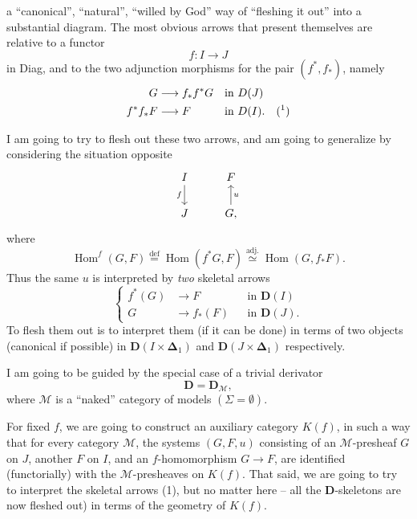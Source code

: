 \documentclass[11pt]{article}
\newcommand{\printedpage}[1]{\marginpar{\footnotesize p.~#1}}
\newcommand{\msp}[1]{\marginpar{\footnotesize [#1]}}
\newcommand{\Hom}{\operatorname{Hom}}
\newcommand{\bDelta}{\boldsymbol{\Delta}}
\begin{document}
\printedpage{4}
\msp{page 78}
a ``canonical'', ``natural'', ``willed by God'' way of ``fleshing it out'' into a substantial diagram. The most obvious arrows that present themselves are relative to a functor
\[ f : I \longrightarrow J \]
in Diag, and to the two adjunction morphisms for the pair $(f^*, f_*)$, namely
\[
\begin{aligned}
G &\longrightarrow f_*f^*G && \text{in } D(J)\\
f^*f_*F &\longrightarrow F && \text{in } D(I). \quad (\text{\footnotemark})
\end{aligned}
\]

I am going to try to flesh out these two arrows, and am going to generalize by considering the situation opposite
\[
\begin{tikzcd}
I \arrow[d, "f"'] & F \\
J & G, \arrow[u, "u"']
\end{tikzcd}
\]
where
\[ \Hom^f(G,F) \overset{\text{def}}{=} \Hom(f^*G,F) \overset{\text{adj.}}{\simeq} \Hom(G,f_*F). \]
Thus the same $u$ is interpreted by \textit{two} skeletal arrows
\[
\left\{
\begin{aligned}
f^*(G) &\longrightarrow F && \text{in } \mathbf{D}(I)\\
G &\longrightarrow f_*(F) && \text{in } \mathbf{D}(J).
\end{aligned}
\right.
\tag*{(1)}
\]
To flesh them out is to interpret them (if it can be done) in terms of two objects (canonical if possible) in $\mathbf{D}(I \times \bDelta_1)$ and $\mathbf{D}(J \times \bDelta_1)$ respectively.

I am going to be guided by the special case of a trivial derivator
\[ \mathbf{D} = \mathbf{D}_{\mathcal{M}}, \]
where $\mathcal{M}$ is a ``naked'' category of models $(\Sigma = \emptyset)$.

\msp{page 79}
For fixed $f$, we are going to construct an auxiliary category $K(f)$, in such a way that for every category $\mathcal{M}$, the systems $(G,F,u)$ consisting of an $\mathcal{M}$-presheaf $G$ on $J$, another $F$ on $I$, and an $f$-homomorphism $G \longrightarrow F$, are identified (functorially) with the $\mathcal{M}$-presheaves on
\printedpage{5}
$K(f)$. That said, we are going to try to interpret the skeletal arrows (1), but no matter here -- all the $\mathbf{D}$-skeletons are now fleshed out) in terms of the geometry of $K(f)$. %
\end{document}
